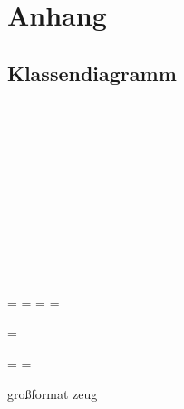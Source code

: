 \chapter{Anhang}

	\section{Klassendiagramm}
	
	
	
	
	
	\getlength{\paperwidth}\\
	\getlength{\paperheight}\\
	\getlength{\pdfpageheight}\\
	\getlength{\pdfpagewidth}\\
	\getlength{\headwidth}\\
	\getlength{\footskip}\\
	\getlength{\textwidth}\\
	\getlength{\textheight}\\
	\getlength{\vsize}\\
	\getlength{\hsize}\\
	
	\newpage
		
	\paperwidth=\pdfpageheight
	\paperheight=\pdfpagewidth
	\pdfpageheight=\paperheight
	\pdfpagewidth=\paperwidth
	\textheight
	
	\begingroup 
	\vsize=\textwidth
	\textheight
	
	\textwidth=\hsize
	\textheight=\vsize
		
		
	großformat zeug
	\lipsum[20-27]
	
